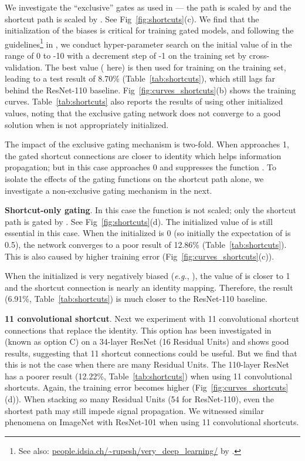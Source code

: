 \documentclass[runningheads]{llncs}
\def\eg{\emph{e.g.}}
\begin{document}
We investigate the ``exclusive'' gates as used in \cite{Srivastava2015,Srivastava2015a} --- the  path is scaled by  and the shortcut path is scaled by . See Fig~\ref{fig:shortcuts}(c). We find that the initialization of the biases  is critical for training gated models, and following the guidelines\footnote{See also: \url{people.idsia.ch/~rupesh/very_deep_learning/} by \cite{Srivastava2015,Srivastava2015a}.} in \cite{Srivastava2015,Srivastava2015a}, we conduct hyper-parameter search on the initial value of  in the range of 0 to -10 with a decrement step of -1 on the training set by cross-validation. The best value ( here) is then used for training on the training set, leading to a test result of 8.70\% (Table~\ref{tab:shortcuts}), which still lags far behind the ResNet-110 baseline. Fig~\ref{fig:curves_shortcuts}(b) shows the training curves.
Table~\ref{tab:shortcuts} also reports the results of using other initialized values, noting that the exclusive gating network does not converge to a good solution when  is not appropriately initialized.

The impact of the exclusive gating mechanism is two-fold. When  approaches 1, the gated shortcut connections are closer to identity which helps information propagation; but in this case  approaches 0 and suppresses the function . To isolate the effects of the gating functions on the shortcut path alone, we investigate a non-exclusive gating mechanism in the next.

\textbf{Shortcut-only gating}. In this case the function  is not scaled; only the shortcut path is gated by . See Fig~\ref{fig:shortcuts}(d). The initialized value of  is still essential in this case. When the initialized  is 0 (so initially the expectation of  is 0.5), the network converges to a poor result of 12.86\% (Table~\ref{tab:shortcuts}). This is also caused by higher training error (Fig~\ref{fig:curves_shortcuts}(c)).

When the initialized  is very negatively biased (\eg, ), the value of  is closer to 1 and the shortcut connection is nearly an identity mapping. Therefore, the result (6.91\%, Table~\ref{tab:shortcuts}) is much closer to the ResNet-110 baseline.

\textbf{11 convolutional shortcut}. Next we experiment with 11 convolutional shortcut connections that replace the identity. This option has been investigated in \cite{He2016} (known as option C) on a 34-layer ResNet (16 Residual Units) and shows good results, suggesting that 11 shortcut connections could be useful. But we find that this is not the case when there are many Residual Units. The 110-layer ResNet has a poorer result (12.22\%, Table~\ref{tab:shortcuts}) when using 11 convolutional shortcuts. Again, the training error becomes higher (Fig~\ref{fig:curves_shortcuts}(d)). When stacking so many Residual Units (54 for ResNet-110), even the shortest path may still impede signal propagation. We witnessed similar phenomena on ImageNet with ResNet-101 when using 11 convolutional shortcuts.
\end{document}

